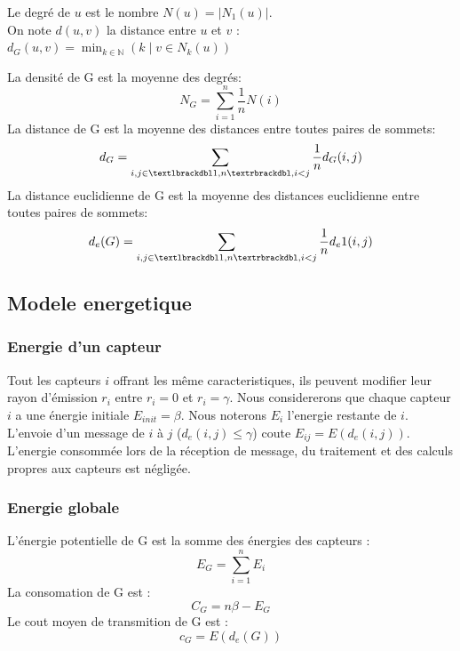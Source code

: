 \begin{mydef}
 Le degré de $ u $ est le nombre  $N(u)=|N_1(u)|$.\\
 On note $d(u,v)$ la distance entre $ u $ et $ v $ : $d_G(u,v)= \min_{k \in \mathbb{N}}(k \mid v \in N_k(u))$
\end{mydef}

\begin{mydef}%
 La densité de G est la moyenne des degrés:$$N_G=\sum_{i=1}^n{\frac1n N(i)}$$
 La distance de G est la moyenne des distances entre toutes paires de sommets:$$d_G=\sum_{i,j\in \textlbrackdbl 1,n \textrbrackdbl,i<j}{\frac1n d_G(i,j)}$$
 La distance euclidienne de G est la moyenne des distances euclidienne entre toutes paires de sommets:$$d_e(G)=\sum_{i,j\in \textlbrackdbl 1,n \textrbrackdbl,i<j}{\frac1n d_e1(i,j)}$$

\end{mydef}

\subsection{Modele energetique}
\subsubsection{Energie d'un capteur}
Tout les capteurs $i$ offrant les même caracteristiques, ils peuvent modifier leur rayon d'émission $r_i$ entre $r_i=0$ et $r_i=\gamma$.
Nous considererons que chaque capteur $i$ a une énergie initiale $E_{init}=\beta$.
Nous noterons $E_i$ l'energie restante de $i$.
L'envoie d'un message de $i$ à $j$ ($d_e(i,j)\leq \gamma$) coute  $ E_{ij}=E(d_e(i,j))$.
L'energie consommée lors de la réception de message, du traitement et des calculs propres aux capteurs est négligée.


\subsubsection{Energie globale}
\begin{mydef}
 L'énergie potentielle de G est la somme des énergies des capteurs :$$E_G=\sum_{i=1}^n{E_i}$$
 La consomation de  G est :$$C_G=n\beta - E_G$$
 Le cout moyen de transmition de  G est :$$c_G=E(d_e(G))$$

\end{mydef}

